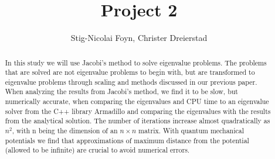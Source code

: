 \documentclass{emulateapj}
\begin{document}
\title{Project 2}

\author{Stig-Nicolai Foyn, Christer Dreierstad}




\begin{abstract}
In this study we will use Jacobi's method to solve eigenvalue problems. The problems that are solved are not eigenvalue problems to begin with, but are transformed to eigenvalue problems through scaling and methods discussed in our previous paper\cite{1}. When analyzing the results from Jacobi's method, we find it to be slow, but numerically accurate, when comparing the eigenvalues and CPU time to an eigenvalue solver from the C++ library Armadillo and comparing the eigenvalues with the results from the analytical solution. The number of iterations increase almost quadratically as $n^2$, with n being the dimension of an $n \times n$ matrix. With quantum mechanical potentials we find that approximations of maximum distance from the potential (allowed to be infinite) are crucial to avoid numerical errors. 

\end{abstract}

\end{document}
